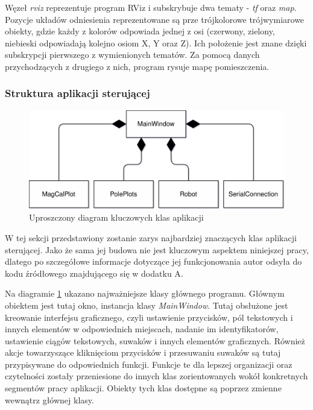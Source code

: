 Węzeł \emph{rviz} reprezentuje program RViz i subskrybuje dwa tematy - \emph{tf} oraz \emph{map}. Pozycje układów odniesienia reprezentowane są prze trójkolorowe trójwymiarowe obiekty, gdzie każdy z kolorów odpowiada jednej z osi (czerwony, zielony, niebieski odpowiadają kolejno osiom X, Y oraz Z). Ich położenie jest znane dzięki subskrypcji pierwszego z wymienionych tematów. Za pomocą danych przychodzących z drugiego z nich, program rysuje mapę pomieszczenia.


\subsubsection{Struktura aplikacji sterującej}
\begin{figure}[ht]
	\centering
		\includegraphics[width=0.8\linewidth]{rys/pc-application-simplified-uml.pdf}
	\caption{Uproszczony diagram kluczowych klas aplikacji}
	\label{fig:simple-class-diagram}
\end{figure}

W tej sekcji przedstawiony zostanie zarys najbardziej znaczących klas aplikacji sterującej. Jako że sama jej budowa nie jest kluczowym aspektem niniejszej pracy, dlatego po szczegółowe informacje dotyczące jej funkcjonowania autor odsyła do kodu źródłowego znajdującego się w dodatku A.

Na diagramie \ref{fig:simple-class-diagram} ukazano najważniejsze klasy głównego programu. Głównym obiektem jest tutaj okno, instancja klasy \emph{MainWindow}. Tutaj obsłużone jest kreowanie interfejsu graficznego, czyli ustawienie przycisków, pól tekstowych i innych elementów w odpowiednich miejscach, nadanie im identyfikatorów, ustawienie ciągów tekstowych, suwaków i innych elementów graficznych. Również akcje towarzyszące kliknięciom przycisków i przesuwaniu suwaków są tutaj przypisywane do odpowiednich funkcji. Funkcje te dla lepszej organizacji oraz czytelności zostały przeniesione do innych klas zorientowanych wokół konkretnych segmentów pracy aplikacji. Obiekty tych klas dostępne są poprzez zmienne wewnątrz głównej klasy.
\\

